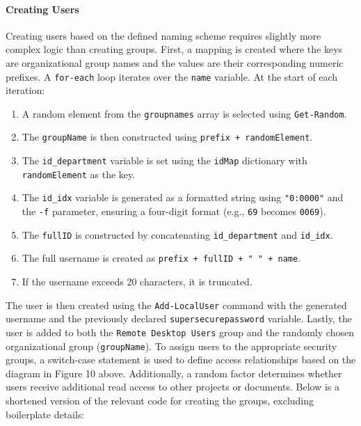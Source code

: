\documentclass[a4paper]{article}
\newcommand{\abc}{\hfill \break}
\begin{document}
\paragraph{Creating Users}\abc
Creating users based on the defined naming scheme requires slightly more complex logic than creating groups.\abc
First, a mapping is created where the keys are organizational group names and the values are their corresponding numeric prefixes.\abc
A \texttt{for-each} loop iterates over the \texttt{name} variable. At the start of each iteration:
\begin{enumerate}
    \item A random element from the \texttt{groupnames} array is selected using \texttt{Get-Random}.
    \item The \texttt{groupName} is then constructed using \texttt{prefix + randomElement}.
    \item The \texttt{id\_department} variable is set using the \texttt{idMap} dictionary with \texttt{randomElement} as the key.
    \item The \texttt{id\_idx} variable is generated as a formatted string using \texttt{"{0:0000}"} and the \texttt{-f} parameter, ensuring a four-digit format (e.g., \texttt{69} becomes \texttt{0069}).
    \item The \texttt{fullID} is constructed by concatenating \texttt{id\_department} and \texttt{id\_idx}.
    \item The full username is created as \texttt{prefix + fullID + " " + name}.
    \item If the username exceeds 20 characters, it is truncated.
\end{enumerate}
The user is then created using the \texttt{Add-LocalUser} command with the generated username and the previously declared \texttt{supersecurepassword} variable.\abc
Lastly, the user is added to both the \texttt{Remote Desktop Users} group and the randomly chosen organizational group (\texttt{groupName}).\abc
To assign users to the appropriate security groups, a switch-case statement is used to define access relationships based on the diagram in Figure 10 above. Additionally, a random factor determines whether users receive additional read access to other projects or documents.
\newpage
Below is a shortened version of the relevant code for creating the groups, excluding boilerplate details:
\end{document}
